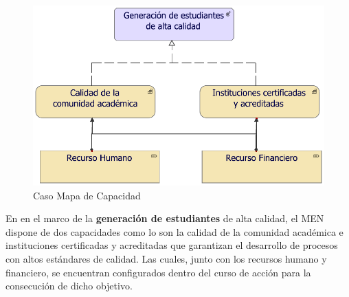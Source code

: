 \begin{figure}[h!]
	\centering
	\includegraphics[width=.8\linewidth]{imgs/modelo/estrategia/capacidad/2.pdf}
	\caption{Caso Mapa de Capacidad}
\end{figure}

En en el marco de la \textbf{generación de estudiantes} de alta calidad, el MEN dispone de dos capacidades como lo son la calidad de la comunidad académica e instituciones certificadas y acreditadas que garantizan el desarrollo de procesos con altos estándares de calidad. Las cuales, junto con los recursos humano y financiero, se encuentran configurados dentro del curso de acción para la consecución de dicho objetivo.